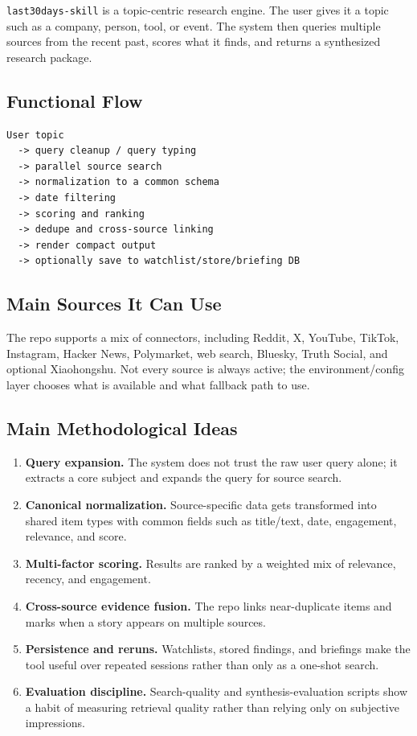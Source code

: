 \documentclass[11pt, letterpaper]{article}
\begin{document}
\texttt{last30days-skill} is a topic-centric research engine. The user gives it a topic such as a company, person, tool, or event. The system then queries multiple sources from the recent past, scores what it finds, and returns a synthesized research package.

\subsection{Functional Flow}

\begin{lstlisting}[title={High-Level Runtime Flow}]
User topic
  -> query cleanup / query typing
  -> parallel source search
  -> normalization to a common schema
  -> date filtering
  -> scoring and ranking
  -> dedupe and cross-source linking
  -> render compact output
  -> optionally save to watchlist/store/briefing DB
\end{lstlisting}

\subsection{Main Sources It Can Use}

The repo supports a mix of connectors, including Reddit, X, YouTube, TikTok, Instagram, Hacker News, Polymarket, web search, Bluesky, Truth Social, and optional Xiaohongshu. Not every source is always active; the environment/config layer chooses what is available and what fallback path to use.

\subsection{Main Methodological Ideas}

\begin{enumerate}[nosep]
    \item \textbf{Query expansion.} The system does not trust the raw user query alone; it extracts a core subject and expands the query for source search.
    \item \textbf{Canonical normalization.} Source-specific data gets transformed into shared item types with common fields such as title/text, date, engagement, relevance, and score.
    \item \textbf{Multi-factor scoring.} Results are ranked by a weighted mix of relevance, recency, and engagement.
    \item \textbf{Cross-source evidence fusion.} The repo links near-duplicate items and marks when a story appears on multiple sources.
    \item \textbf{Persistence and reruns.} Watchlists, stored findings, and briefings make the tool useful over repeated sessions rather than only as a one-shot search.
    \item \textbf{Evaluation discipline.} Search-quality and synthesis-evaluation scripts show a habit of measuring retrieval quality rather than relying only on subjective impressions.
\end{enumerate}
\end{document}
